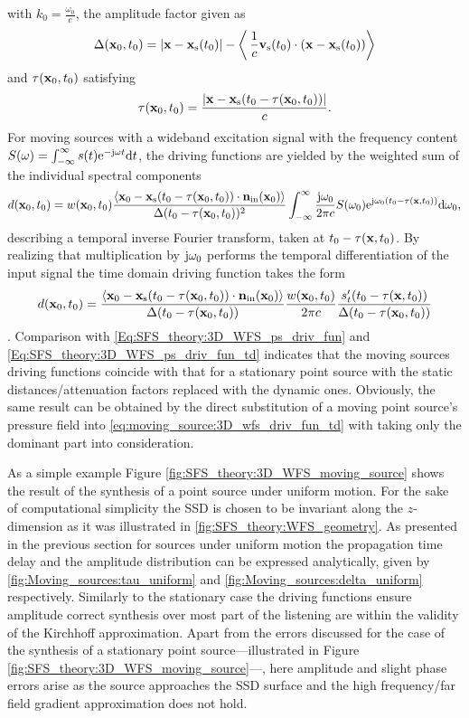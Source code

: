 with $k_0 = \frac{\omega_0}{c}$, the amplitude factor given as
\begin{equation}
\Delta( \mathbf{x}_0,t_0 ) = |\mathbf{x} - \mathbf{x}_{\mathrm{s}}(t_0)| - \left<\, \frac{1}{c}\mathbf{v}_{\mathrm{s}}(t_0) \cdot (\mathbf{x} - \mathbf{x}_{\mathrm{s}}(t_0)) \right> 
\end{equation}
and $\tau(\mathbf{x}_0,t_0)$ satisfying
\begin{equation}
\tau(\mathbf{x}_0,t_0) =  \frac{| \mathbf{x} - \mathbf{x}_{\mathrm{s}}( t_0 - \tau(\mathbf{x}_0,t_0)) |  }{c}.
\end{equation}
For moving sources with a wideband excitation signal with the frequency content $S(\omega) = \int_{-\infty}^{\infty} s(t) \mathrm{e}^{-\mathrm{j} \omega t} \mathrm{d} t$, the driving functions are yielded by the weighted sum of the individual spectral components
\begin{equation}
d(\mathbf{x}_0,t_0) =  w(\mathbf{x}_0,t_0)  
\frac{\left< \mathbf{x}_0 -\mathbf{x}_{\mathrm{s}}(t_0-\tau(\mathbf{x}_0,t_0)) \cdot \mathbf{n}_{\mathrm{in}}(\mathbf{x}_0) \right>}{\Delta(t_0-\tau(\mathbf{x}_0,t_0))^2}
\int_{-\infty}^{\infty} \frac{\mathrm{j} \omega_0}{2\pi c} S(\omega_0 )\mathrm{e}^{\mathrm{j} \omega_0\left( t_0 - \tau( \mathbf{x},t_0 )\right)} \mathrm{d} \omega_0,
\end{equation}
describing a temporal inverse Fourier transform, taken at $t_0 - \tau( \mathbf{x},t_0 )$.
By realizing that multiplication by $\mathrm{j} \omega_0$ performs the temporal differentiation of the input signal the time domain driving function takes the form
\begin{equation}
d(\mathbf{x}_0,t_0) =   
\frac{\left< \mathbf{x}_0 -\mathbf{x}_{\mathrm{s}}(t_0-\tau(\mathbf{x}_0,t_0)) \cdot \mathbf{n}_{\mathrm{in}}(\mathbf{x}_0) \right>}{\Delta(t_0-\tau(\mathbf{x}_0,t_0))}
\frac{w(\mathbf{x}_0,t_0)}{2\pi c} \frac{s'_t( t_0 - \tau( \mathbf{x},t_0 ) )}{\Delta(t_0-\tau(\mathbf{x}_0,t_0))}
\end{equation}.	
Comparison with \eqref{Eq:SFS_theory:3D_WFS_ps_driv_fun} and \eqref{Eq:SFS_theory:3D_WFS_ps_driv_fun_td} indicates that the moving sources driving functions coincide with that for a stationary point source with the static distances/attenuation factors replaced with the dynamic ones.
Obviously, the same result can be obtained by the direct substitution of a moving point source's pressure field into \eqref{eq:moving_source:3D_wfs_driv_fun_td} with taking only the dominant part into consideration.

As a simple example Figure \ref{fig:SFS_theory:3D_WFS_moving_source} shows the result of the synthesis of a point source under uniform motion.
For the sake of computational simplicity the SSD is chosen to be invariant along the $z$-dimension as it was illustrated in \ref{fig:SFS_theory:WFS_geometry}.
As presented in the previous section for sources under uniform motion the propagation time delay and the amplitude distribution can be expressed analytically, given by \eqref{fig:Moving_sources:tau_uniform} and \eqref{fig:Moving_sources:delta_uniform} respectively.
Similarly to the stationary case the driving functions ensure amplitude correct synthesis over most part of the listening are within the validity of the Kirchhoff approximation.
Apart from the errors discussed for the case of the synthesis of a stationary point source---illustrated in Figure \ref{fig:SFS_theory:3D_WFS_moving_source}---, here amplitude and slight phase errors arise as the source approaches the SSD surface and the high frequency/far field gradient approximation does not hold.

